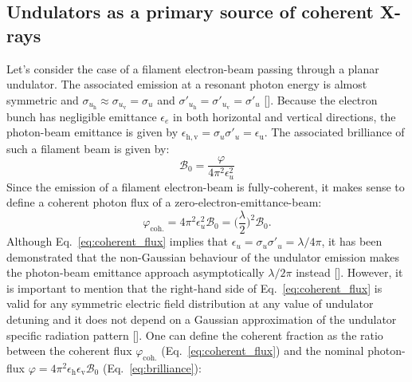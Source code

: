 \begin{refsection}
\subsection{Undulators as a primary source of coherent X-rays}\label{sec:undulators}

 Let's consider the case of a filament electron-beam passing through a planar undulator. The associated emission at a resonant photon energy is almost symmetric and $\sigma_{u_{\mathrm{h}}}\approx\sigma_{u_{\mathrm{v}}}=\sigma_{u}$ and $\sigma'_{u_{\mathrm{h}}}=\sigma'_{u_{\mathrm{v}}}=\sigma'_{u}$ [\cite{Kim1989}]. Because the electron bunch has negligible emittance $\epsilon_e$ in both horizontal and vertical directions, the photon-beam emittance is given by $\epsilon_\mathrm{h,v}=\sigma_{u}\sigma'_u=\epsilon_\mathrm{u}$. The associated brilliance of such a filament beam is given by:
\begin{equation}\label{eq:brilliance_coherent}
\mathcal{B}_0 = \frac{\varphi}{4\pi^2\epsilon^2_{u}}
\end{equation}{}
Since the emission of a filament electron-beam is fully-coherent, it makes sense to define a coherent photon flux of a zero-electron-emittance-beam:
\begin{equation}\label{eq:coherent_flux}
\varphi_\mathrm{coh.} = 4\pi^2\epsilon^2_{u}\mathcal{B}_0=\Bigg(\frac{\lambda}{2}\Bigg)^2\mathcal{B}_0.
\end{equation}{}
Although Eq.~\ref{eq:coherent_flux} implies that $\epsilon_u = \sigma_u\sigma'_u =\lambda/4\pi$, it has been demonstrated that the non-Gaussian behaviour of the undulator emission makes the photon-beam emittance approach asymptotically $\lambda/2\pi$ instead [\cite{Elleaume2013,Tanaka2009}]. However, it is important to mention that the right-hand side of Eq.~\ref{eq:coherent_flux} is valid for any symmetric electric field distribution at any value of undulator detuning and it does not depend on a Gaussian approximation of the undulator specific radiation pattern [\cite{Walker2019}]. One can define the coherent fraction as the ratio between the coherent flux $\varphi_\mathrm{coh.}$ (Eq.~\ref{eq:coherent_flux}) and the nominal photon-flux $\varphi = 4\pi^2\epsilon_\mathrm{h}\epsilon_\mathrm{v}\mathcal{B}_0$ (Eq.~\ref{eq:brilliance}):

\end{refsection}
